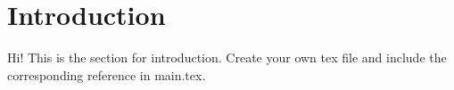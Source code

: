 \section{Introduction}

Hi! This is the section for introduction.
Create your own tex file and include the corresponding reference in main.tex.
